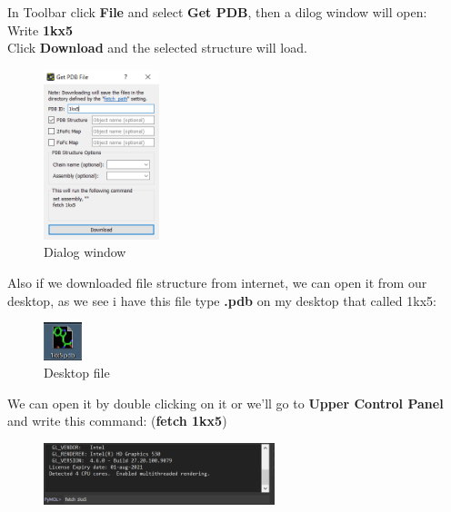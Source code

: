 \documentclass{article}
\begin{document}
In Toolbar click \textbf{File} and select \textbf{Get PDB}, then a dilog window will open:\\

Write \textbf{1kx5} \\

Click \textbf{Download} and the selected structure will load. \\

\begin{figure}[H]
    \centering
    \includegraphics[width=0.3\textwidth]{workshops/pymol/imgs/dialogwindow.png}
    \caption[]{Dialog window}
    \label{dialogwindow}
\end{figure}

Also if we downloaded file structure from internet, we can open it from our desktop, as we see i have this file type \textbf{.pdb} on my desktop that called 1kx5: \\

\begin{figure}[H]
    \centering
    \includegraphics[width=0.1\textwidth]{workshops/pymol/imgs/dtfileimg.png}
    \caption[]{Desktop file}
    \label{dtfile}
\end{figure}

We can open it by double clicking on it or we'll go to \textbf{Upper Control Panel} and write this command: (\textbf{fetch 1kx5}) \\

\begin{figure}[H]
    \centering
    \includegraphics[width=0.6\textwidth]{workshops/pymol/imgs/ucpcmd.png}
    \caption[]{}
    \label{ucpcommand}
\end{figure}
\end{document}
